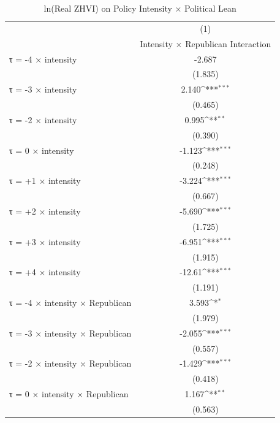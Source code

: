 \begin{table}[htbp]\centering
\def\sym#1{\ifmmode^{#1}\else\(^{#1}\)\fi}
\caption{ln(Real ZHVI) on Policy Intensity × Political Lean}
\begin{tabular}{l*{1}{c}}
\hline\hline
                    &\multicolumn{1}{c}{(1)}\\
                    &\multicolumn{1}{c}{Intensity × Republican Interaction}\\
\hline
τ = -4 × intensity  &      -2.687         \\
                    &     (1.835)         \\
[1em]
τ = -3 × intensity  &       2.140\sym{***}\\
                    &     (0.465)         \\
[1em]
τ = -2 × intensity  &       0.995\sym{**} \\
                    &     (0.390)         \\
[1em]
τ = 0 × intensity   &      -1.123\sym{***}\\
                    &     (0.248)         \\
[1em]
τ = +1 × intensity  &      -3.224\sym{***}\\
                    &     (0.667)         \\
[1em]
τ = +2 × intensity  &      -5.690\sym{***}\\
                    &     (1.725)         \\
[1em]
τ = +3 × intensity  &      -6.951\sym{***}\\
                    &     (1.915)         \\
[1em]
τ = +4 × intensity  &      -12.61\sym{***}\\
                    &     (1.191)         \\
[1em]
τ = -4 × intensity × Republican&       3.593\sym{*}  \\
                    &     (1.979)         \\
[1em]
τ = -3 × intensity × Republican&      -2.055\sym{***}\\
                    &     (0.557)         \\
[1em]
τ = -2 × intensity × Republican&      -1.429\sym{***}\\
                    &     (0.418)         \\
[1em]
τ = 0 × intensity × Republican&       1.167\sym{**} \\
                    &     (0.563)         \\

\end{tabular}
\end{table}
